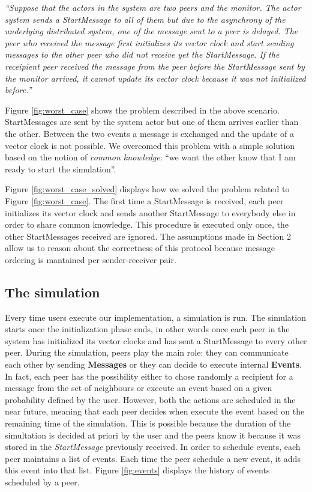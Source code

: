 \documentclass[11pt]{article}
\begin{document}
\vspace{0.2cm}
\emph{``Suppose that the actors in the system are two peers and the monitor. The actor system sends a StartMessage to all of them but due to the asynchrony of the underlying distributed system, one of the message sent to a peer is delayed. The peer who received the message first initializes its vector clock and start sending messages to the other peer who did not receive yet the StartMessage. If the receipient peer received the message from the peer before the StartMessage sent by the monitor arrived, it cannot update its vector clock because it was not initialized before.''}
\vspace{0.2cm}



\noindent
Figure \ref{fig:worst_case} shows the problem described in the above scenario. StartMessages are sent by the system actor but one of them arrives earlier than the other. Between the two events a message is exchanged and the update of a vector clock is not possible. We overcomed this problem with a simple solution based on the notion of \textit{common knowledge}: ``we want the other know that I am ready to start the simulation''.



\noindent
Figure \ref{fig:worst_case_solved} displays how we solved the problem related to Figure \ref{fig:worst_case}. The first time a StartMessage is received, each peer initializes its vector clock and sends another StartMessage to everybody else in order to share common knowledge. This procedure is executed only once, the other StartMessages received are ignored. The assumptions made in Section 2 allow us to reason about the correctness of this protocol because message ordering is mantained per sender-receiver pair.

\subsection{The simulation}

Every time users execute our implementation, a simulation is run. The simulation starts once the initialization phase ends, in other words once each peer in the system has initialized its vector clocks and has sent a StartMessage to every other peer. During the simulation, peers play the main role: they can communicate each other by sending \textbf{Messages} or they can decide to execute internal \textbf{Events}. In fact, each peer has the possibility either to chose randomly a recipient for a message from the set of neighbours or execute an event based on a given probability defined by the user. However, both the actions are scheduled in the near future, meaning that each peer decides when execute the event based on the remaining time of the simulation. This is possible because the duration of the simultation is decided at priori by the user and the peers know it because it was stored in the \textit{StartMessage} previously received. In order to schedule events, each peer maintains a list of events. Each time the peer schedule a new event, it adds this event into that list. Figure \ref{fig:events} displays the history of events scheduled by a peer.
\end{document}
